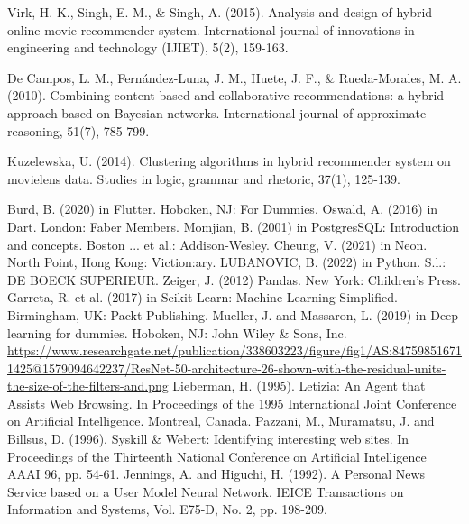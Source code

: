 \begin{thebibliography}{99}
    Virk, H. K., Singh, E. M., \& Singh, A. (2015). Analysis and design of hybrid online movie recommender system. International journal of innovations in engineering and technology (IJIET), 5(2), 159-163.

    De Campos, L. M., Fernández-Luna, J. M., Huete, J. F., \& Rueda-Morales, M. A. (2010). Combining content-based and collaborative recommendations: a hybrid approach based on Bayesian networks. International journal of approximate reasoning, 51(7), 785-799.
   
    Kuzelewska, U. (2014). Clustering algorithms in hybrid recommender system on movielens data. Studies in logic, grammar and rhetoric, 37(1), 125-139.

    Burd, B. (2020) in Flutter. Hoboken, NJ: For Dummies.    
    Oswald, A. (2016) in Dart. London: Faber Members. 
    Momjian, B. (2001) in PostgresSQL: Introduction and concepts. Boston ... et al.: Addison-Wesley. 
    Cheung, V. (2021) in Neon. North Point, Hong Kong: Viction:ary. 
    LUBANOVIC, B. (2022) in Python. S.l.: DE BOECK SUPERIEUR. 
    Zeiger, J. (2012) Pandas. New York: Children's Press. 
    Garreta, R. et al. (2017) in Scikit-Learn: Machine Learning Simplified. Birmingham, UK: Packt Publishing. 
    Mueller, J. and Massaron, L. (2019) in Deep learning for dummies. Hoboken, NJ: John Wiley \& Sons, Inc. 
    \url{https://www.researchgate.net/publication/338603223/figure/fig1/AS:847598516711425@1579094642237/ResNet-50-architecture-26-shown-with-the-residual-units-the-size-of-the-filters-and.png}
    Lieberman, H. (1995). Letizia: An Agent that Assists Web Browsing. In
    Proceedings of the 1995 International Joint Conference on Artificial Intelligence. Montreal,
    Canada.
     Pazzani, M., Muramatsu, J. and Billsus, D. (1996). Syskill \& Webert: Identifying
    interesting web sites. In Proceedings of the Thirteenth National Conference on Artificial
    Intelligence AAAI 96, pp. 54-61.
     Jennings, A. and Higuchi, H. (1992). A Personal News Service based on a
    User Model Neural Network. IEICE Transactions on Information and Systems, Vol. E75-D, No. 2,
    pp. 198-209.
\end{thebibliography}
